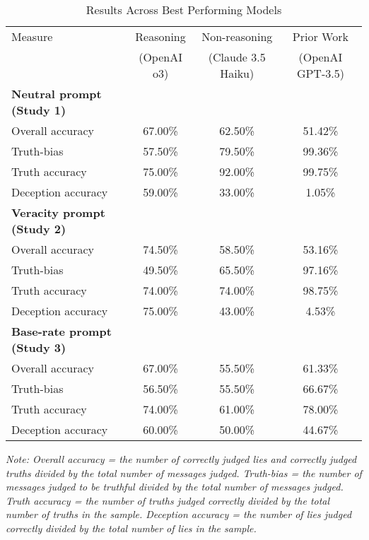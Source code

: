 \documentclass{article}
\begin{document}
\begin{table}[ht]
\centering
\caption{Results Across Best Performing Models}
\begin{tabular}{lccc}
\toprule
Measure & Reasoning & Non-reasoning & Prior Work \citep{markowitz_generative_2024} \\
 & (OpenAI o3) & (Claude 3.5 Haiku) & (OpenAI GPT-3.5) \\
\midrule
\textbf{Neutral prompt (Study 1)} & & & \\
Overall accuracy & 67.00\% & 62.50\% & 51.42\% \\
Truth-bias & 57.50\% & 79.50\% & 99.36\% \\
Truth accuracy & 75.00\% & 92.00\% & 99.75\% \\
Deception accuracy & 59.00\% & 33.00\% & 1.05\% \\
\midrule
\textbf{Veracity prompt (Study 2)} & & & \\
Overall accuracy & 74.50\% & 58.50\% & 53.16\% \\
Truth-bias & 49.50\% & 65.50\% & 97.16\% \\
Truth accuracy & 74.00\% & 74.00\% & 98.75\% \\
Deception accuracy & 75.00\% & 43.00\% & 4.53\% \\
\midrule
\textbf{Base-rate prompt (Study 3)} & & & \\
Overall accuracy & 67.00\% & 55.50\% & 61.33\% \\
Truth-bias & 56.50\% & 55.50\% & 66.67\% \\
Truth accuracy & 74.00\% & 61.00\% & 78.00\% \\
Deception accuracy & 60.00\% & 50.00\% & 44.67\% \\
\bottomrule
\end{tabular}
\begin{minipage}{0.9\linewidth}
\vspace{0.05in}
\footnotesize
\textit{Note: Overall accuracy = the number of correctly judged lies and correctly judged truths divided by the total number of messages judged. Truth-bias = the number of messages judged to be truthful divided by the total number of messages judged. Truth accuracy = the number of truths judged correctly divided by the total number of truths in the sample. Deception accuracy = the number of lies judged correctly divided by the total number of lies in the sample.}
\end{minipage}
\end{table}
\end{document}

